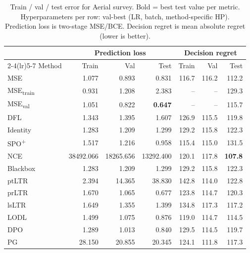\begin{table}[t]
\centering
\caption{Train / val / test error for Aerial survey. Bold = best test value per metric. Hyperparameters per row: val-best (LR, batch, method-specific HP). Prediction loss is two-stage MSE/BCE. Decision regret is mean absolute regret (lower is better).}
\label{tab:err-asurv}
\setlength{\tabcolsep}{4pt}
\renewcommand{\arraystretch}{1.05}
\begin{tabular}{@{}lrrrrrr@{}}
\toprule
& \multicolumn{3}{c}{Prediction loss} & \multicolumn{3}{c}{Decision regret} \\
\cmidrule(lr){2-4}\cmidrule(lr){5-7}
Method & Train & Val & Test & Train & Val & Test \\
\midrule
MSE & 1.077 & 0.893 & 0.831 & 116.7 & 116.2 & 112.2 \\
MSE\textsubscript{train} & 0.931 & 1.208 & 2.383 & -- & -- & 129.3 \\
MSE\textsubscript{val} & 1.051 & 0.822 & \textbf{0.647} & -- & -- & 115.7 \\
DFL & 1.343 & 1.395 & 1.607 & 126.9 & 115.5 & 119.8 \\
Identity & 1.283 & 1.209 & 1.299 & 129.2 & 115.8 & 122.3 \\
SPO\textsuperscript{+} & 1.517 & 1.216 & 0.958 & 115.4 & 115.0 & 131.5 \\
NCE & 38492.066 & 18265.656 & 13292.400 & 120.1 & 117.8 & \textbf{107.8} \\
Blackbox & 1.283 & 1.209 & 1.299 & 129.2 & 115.8 & 122.3 \\
ptLTR & 2.394 & 14.365 & 38.830 & 142.8 & 114.0 & 122.8 \\
prLTR & 1.670 & 1.065 & 0.677 & 123.8 & 114.7 & 120.3 \\
lsLTR & 1.649 & 1.355 & 1.399 & 134.8 & 117.3 & 117.2 \\
LODL & 1.499 & 1.075 & 0.876 & 119.0 & 114.7 & 114.5 \\
DPO & 1.289 & 1.013 & 0.840 & 129.5 & 114.5 & 119.7 \\
PG & 28.150 & 20.855 & 20.345 & 124.1 & 111.8 & 117.3 \\
\bottomrule
\end{tabular}
\end{table}

